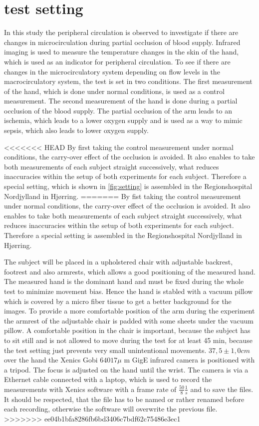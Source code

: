 \chapter{test setting}
In this study the peripheral circulation is observed to investigate if there are changes in microcirculation during partial occlusion of blood supply. Infrared imaging is used to measure the temperature changes in the skin of the hand, which is used as an indicator for peripheral circulation. 
To see if there are changes in the microcirculatory system depending on flow levels in the macrocirculatory system, the test is set in two conditions. The first measurement of the hand, which is done under normal conditions, is used as a control measurement. The second measurement of the hand is done during a partial occlusion of the blood supply. The partial occlusion of the arm leads to an ischemia, which leads to a lower oxygen supply and is used as a way to mimic sepsis, which also leads to lower oxygen supply. 

<<<<<<< HEAD
By first taking the control measurement under normal conditions, the carry-over effect of the occlusion is avoided. It also enables to take both measurements of each subject straight successively, what reduces inaccuracies within the setup of both experiments for each subject. Therefore a special setting, which is shown in \cref{fig:setting} is assembled in the Regionshospital Nordjylland in Hj\o{}rring.
=======
By fist taking the control measurement under normal conditions, the carry-over effect of the occlusion is avoided. It also enables to take both measurements of each subject straight successively, what reduces inaccuracies within the setup of both experiments for each subject. Therefore a special setting is assembled in the Regionshospital Nordjylland in Hj\o{}rring.

The subject will be placed in a upholstered chair with adjustable backrest, footrest and also armrests, which allows a good positioning of the measured hand. The measured hand is the dominant hand and must be fixed during the whole test to minimize movement bias. Hence the hand is stabled with a vacuum pillow which is covered by a micro fiber tissue to get a better background for the images. To provide a more comfortable position of the arm during the experiment the armrest of the adjustable chair is padded with some sheets under the vacuum pillow. A comfortable position in the chair is important, because the subject has to sit still and is not allowed to move during the test for at least 45 min, because the test setting just prevents very small unintentional movements.
$37,5\pm 1,0 cm$ over the hand the Xenics Gobi $640 17\mu$ m GigE infrared camera is positioned with a tripod. The focus is adjusted on the hand until the wrist.
The camera is via a Ethernet cable connected with a laptop, which is used to record the measurements with Xenics software with a frame rate of $ \frac{50}{8} \frac{1}{s} $ and to save the files. It should be respected, that the file has to be named or rather renamed before each recording, otherwise the software will overwrite the previous file.
>>>>>>> ee04b1bfa8286fb6bd3406c7bdf62c75486e3ec1

